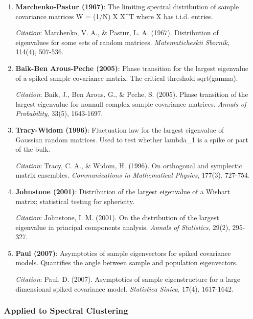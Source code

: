 \documentclass[
  12pt,
]{article}
\begin{document}
\begin{enumerate}
\def\labelenumi{\arabic{enumi}.}
\item
  \textbf{Marchenko-Pastur (1967)}: The limiting spectral distribution
  of sample covariance matrices W = (1/N) X X\^{}T where X has i.i.d.
  entries.

  \emph{Citation}: Marchenko, V. A., \& Pastur, L. A. (1967).
  Distribution of eigenvalues for some sets of random matrices.
  \emph{Matematicheskii Sbornik}, 114(4), 507-536.
\item
  \textbf{Baik-Ben Arous-Peche (2005)}: Phase transition for the largest
  eigenvalue of a spiked sample covariance matrix. The critical
  threshold sqrt(gamma).

  \emph{Citation}: Baik, J., Ben Arous, G., \& Peche, S. (2005). Phase
  transition of the largest eigenvalue for nonnull complex sample
  covariance matrices. \emph{Annals of Probability}, 33(5), 1643-1697.
\item
  \textbf{Tracy-Widom (1996)}: Fluctuation law for the largest
  eigenvalue of Gaussian random matrices. Used to test whether lambda\_1
  is a spike or part of the bulk.

  \emph{Citation}: Tracy, C. A., \& Widom, H. (1996). On orthogonal and
  symplectic matrix ensembles. \emph{Communications in Mathematical
  Physics}, 177(3), 727-754.
\item
  \textbf{Johnstone (2001)}: Distribution of the largest eigenvalue of a
  Wishart matrix; statistical testing for sphericity.

  \emph{Citation}: Johnstone, I. M. (2001). On the distribution of the
  largest eigenvalue in principal components analysis. \emph{Annals of
  Statistics}, 29(2), 295-327.
\item
  \textbf{Paul (2007)}: Asymptotics of sample eigenvectors for spiked
  covariance models. Quantifies the angle between sample and population
  eigenvectors.

  \emph{Citation}: Paul, D. (2007). Asymptotics of sample eigenstructure
  for a large dimensional spiked covariance model. \emph{Statistica
  Sinica}, 17(4), 1617-1642.
\end{enumerate}

\subsubsection{Applied to Spectral
Clustering}\label{applied-to-spectral-clustering}
\end{document}
